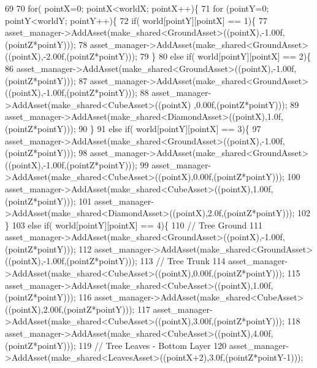 \begin{DoxyCode}
69 
70   \textcolor{keywordflow}{for}( pointX=0; pointX<worldX; pointX++)\{
71    \textcolor{keywordflow}{for} (pointY=0; pointY<worldY; pointY++)\{
72     \textcolor{keywordflow}{if}( world[pointY][pointX] == 1)\{          
77             asset\_manager->AddAsset(make\_shared<GroundAsset>((pointX),-1.00f,(pointZ*pointY)));
78             asset\_manager->AddAsset(make\_shared<GroundAsset>((pointX),-2.00f,(pointZ*pointY)));
79    \}
80     \textcolor{keywordflow}{else} \textcolor{keywordflow}{if}( world[pointY][pointX] == 2)\{
86             asset\_manager->AddAsset(make\_shared<GroundAsset>((pointX),-1.00f,(pointZ*pointY)));
87             asset\_manager->AddAsset(make\_shared<GroundAsset>((pointX),-1.00f,(pointZ*pointY)));
88             asset\_manager->AddAsset(make\_shared<CubeAsset>((pointX)  ,0.00f,(pointZ*pointY)));
89             asset\_manager->AddAsset(make\_shared<DiamondAsset>((pointX),1.0f,(pointZ*pointY)));
90    \}
91     \textcolor{keywordflow}{else} \textcolor{keywordflow}{if}( world[pointY][pointX] == 3)\{
97             asset\_manager->AddAsset(make\_shared<GroundAsset>((pointX),-1.00f,(pointZ*pointY)));
98             asset\_manager->AddAsset(make\_shared<GroundAsset>((pointX),-1.00f,(pointZ*pointY)));
99             asset\_manager->AddAsset(make\_shared<CubeAsset>((pointX),0.00f,(pointZ*pointY)));
100             asset\_manager->AddAsset(make\_shared<CubeAsset>((pointX),1.00f,(pointZ*pointY)));
101             asset\_manager->AddAsset(make\_shared<DiamondAsset>((pointX),2.0f,(pointZ*pointY)));
102    \}
103     \textcolor{keywordflow}{else} \textcolor{keywordflow}{if}( world[pointY][pointX] == 4)\{
110             \textcolor{comment}{// Tree Ground}
111             asset\_manager->AddAsset(make\_shared<GroundAsset>((pointX),-1.00f,(pointZ*pointY)));
112             asset\_manager->AddAsset(make\_shared<GroundAsset>((pointX),-1.00f,(pointZ*pointY)));
113             \textcolor{comment}{// Tree Trunk}
114             asset\_manager->AddAsset(make\_shared<CubeAsset>((pointX),0.00f,(pointZ*pointY)));
115             asset\_manager->AddAsset(make\_shared<CubeAsset>((pointX),1.00f,(pointZ*pointY)));
116             asset\_manager->AddAsset(make\_shared<CubeAsset>((pointX),2.00f,(pointZ*pointY)));
117             asset\_manager->AddAsset(make\_shared<CubeAsset>((pointX),3.00f,(pointZ*pointY)));
118             asset\_manager->AddAsset(make\_shared<CubeAsset>((pointX),4.00f,(pointZ*pointY)));
119             \textcolor{comment}{// Tree Leaves - Bottom Layer}
120             asset\_manager->AddAsset(make\_shared<LeavesAsset>((pointX+2),3.0f,(pointZ*pointY-1)));

\end{DoxyCode}
